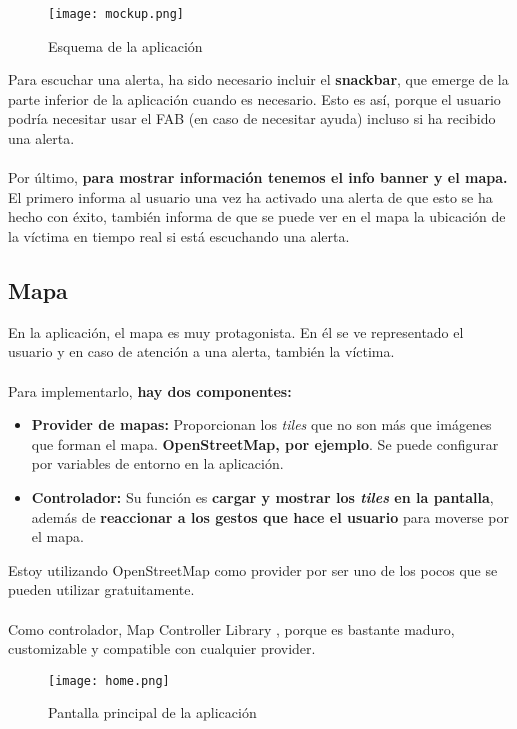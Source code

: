 \begin{figure}[H]
	\centering	
	\texttt{[image: mockup.png]}
	\caption{Esquema de la aplicación}
	\end{figure}

Para escuchar una alerta, ha sido necesario incluir el \textbf{snackbar}, que emerge de la parte inferior de la aplicación cuando es necesario.
Esto es así, porque el usuario podría necesitar usar el FAB (en caso de necesitar ayuda) incluso si ha recibido una alerta. \\ \\

Por último, \textbf{para mostrar información tenemos el info banner y el mapa.} El primero informa al usuario una vez ha activado
una alerta de que esto se ha hecho con éxito, también informa de que se puede ver en el mapa la ubicación de la víctima en tiempo real
si está escuchando una alerta.

\subsection{Mapa}
En la aplicación, el mapa es muy protagonista. En él se ve representado el usuario y en caso de
atención a una alerta, también la víctima. \\ \\
Para implementarlo, \textbf{hay dos componentes:}
 \begin{itemize}
   \item \textbf{Provider de mapas:} Proporcionan los \textit{tiles} que no son más que imágenes que forman el mapa. \textbf{OpenStreetMap, por ejemplo}. Se puede configurar por variables de entorno en la aplicación.
   \item \textbf{Controlador:} Su función es \textbf{cargar y mostrar los \textit{tiles} en la pantalla}, además de \textbf{reaccionar a los gestos que hace el usuario} para moverse por el mapa. 
 \end{itemize}

 Estoy utilizando OpenStreetMap como provider \cite{openstreetmap} por ser uno de los pocos que se pueden utilizar gratuitamente. \\ \\
 Como controlador, Map Controller Library \cite{map}, porque es bastante maduro, customizable y compatible con cualquier provider.

\begin{figure}[H]
	\centering	
	\texttt{[image: home.png]}
	\caption{Pantalla principal de la aplicación}
	\end{figure}

